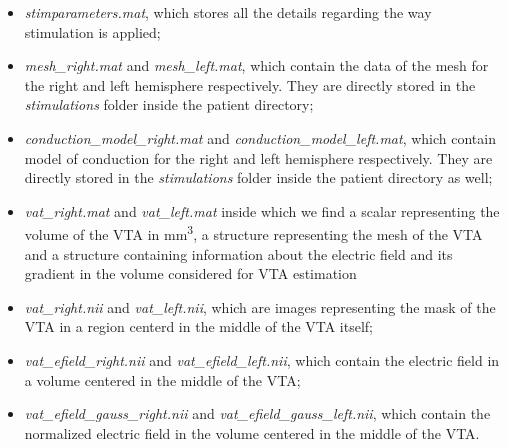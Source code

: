\documentclass[a4paper,11pt]{article}
\begin{document}
\begin{itemize}
\item \emph{stimparameters.mat}, which stores all the details regarding the way stimulation is applied;
\item \emph{mesh\_right.mat} and \emph{mesh\_left.mat}, which contain the data of the mesh for the right and left hemisphere respectively. They are directly stored in the \emph{stimulations} folder inside the patient directory;
\item \emph{conduction\_model\_right.mat} and \emph{conduction\_model\_left.mat}, which contain model of conduction for the right and left hemisphere respectively. They are directly stored in the \emph{stimulations} folder inside the patient directory as well;
\item \emph{vat\_right.mat} and \emph{vat\_left.mat} inside which we find a scalar representing the volume of the VTA in mm\textsuperscript{3}, a structure representing the mesh of the VTA and a structure containing information about the electric field and its gradient in the volume considered for VTA estimation
\item \emph{vat\_right.nii} and \emph{vat\_left.nii}, which are images representing the mask of the VTA in a region centerd in the middle of the VTA itself;
\item \emph{vat\_efield\_right.nii} and \emph{vat\_efield\_left.nii}, which contain the electric field in a volume centered in the middle of the VTA;
\item \emph{vat\_efield\_gauss\_right.nii} and \emph{vat\_efield\_gauss\_left.nii}, which contain the normalized electric field in the volume centered in the middle of the VTA.
\end{itemize}
\end{document}
